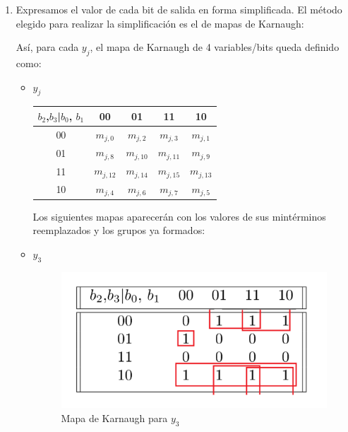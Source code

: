 \documentclass[../../informe/src/main.tex]{subfiles}
\begin{document}
\begin{enumerate}
 \item Expresamos el valor de cada bit de salida en forma simplificada. El método elegido para realizar la simplificación es el de mapas de Karnaugh: \par
 
Así, para cada $y_{j}$, el mapa de Karnaugh de 4 variables/bits queda definido como: 
\begin{itemize} 

\item $y_{j}$
 \begin{table}[H] %
\centering
 \begin{tabular}{||c c c c c||} 
 \hline
$b_{2}$,$b_{3}$|$b_{0}$, $b_{1}$ & 00 & 01 & 11 & 10\\ [0.5ex] 
 \hline\hline
00 & $m_{j,0}$ & $m_{j,2}$ & $m_{j,3}$ & $m_{j,1}$\\
01 & $m_{j,8}$ & $m_{j,10}$ & $m_{j,11}$ & $m_{j,9}$\\
11 & $m_{j,12}$ & $m_{j,14}$ & $m_{j,15}$ & $m_{j,13}$\\
10 & $m_{j,4}$ & $m_{j,6}$ & $m_{j,7}$ & $m_{j,5}$\\[1ex] 
\hline
\end{tabular}
\end{table}
Los siguientes mapas aparecerán con los valores de sus mintérminos reemplazados y los grupos ya formados:

\item $y_3$ 				

\begin{figure}[H]	%
	\centering
	\includegraphics[scale=0.4]{imagenes/karnaugh_mapa_y3.png}
	\caption{Mapa de Karnaugh para $y_3$}
	\label{fig:ej4_karnaugh_mapa_y3}
\end{figure}


\end{itemize}
\end{enumerate}
\end{document}
